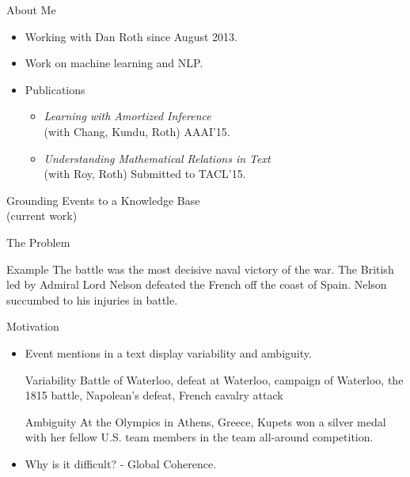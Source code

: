 \begin{frame}{About Me}
  \begin{itemize}
  \item Working with Dan Roth since August 2013.
  \item Work on machine learning and NLP.
  \item Publications
    \begin{itemize}
    \item \emph{Learning with Amortized Inference} \\
      (with Chang, Kundu, Roth) AAAI'15.
    \item \emph{Understanding Mathematical Relations in Text} \\
      (with Roy, Roth) Submitted to TACL'15.
      \end{itemize}
  \end{itemize}
\end{frame}

\begin{frame}
  \begin{center}
    {
      \huge Grounding Events to a Knowledge Base
    } \\
    (current work)
  \end{center}
\end{frame}


\begin{frame}{The Problem}

  \begin{exampleblock}{Example}
      {The { battle} was the most decisive naval victory of the {war}}. The British led by Admiral Lord Nelson defeated the French off the coast of Spain. Nelson succumbed to his injuries in battle.
      \end{exampleblock}
  \end{frame}
\begin{frame}{Motivation}
  \begin{itemize}[<+->]
  \item Event mentions in a text display variability and ambiguity.
    \begin{exampleblock}{Variability}
      {Battle of Waterloo, defeat at Waterloo, campaign of Waterloo, the 1815 battle, Napolean's defeat, French cavalry attack}
    \end{exampleblock}
    \begin{exampleblock}{Ambiguity}
     At the { Olympics } in Athens, Greece, Kupets won a silver medal with her fellow U.S. team members in the team all-around competition.
    \end{exampleblock}
  \item Why is it difficult? - Global Coherence.
  \end{itemize}
\end{frame}

